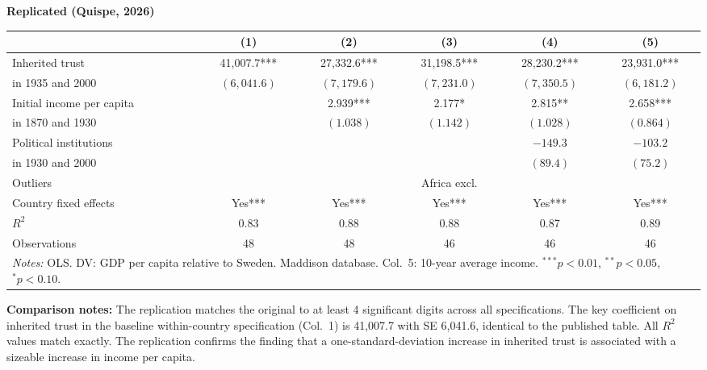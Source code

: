 \documentclass[11pt,a4paper]{article}
\begin{document}
\begin{minipage}[t]{0.48\textwidth}
\centering
\textbf{\large Replicated (Quispe, 2026)}
\vspace{0.3cm}

\begin{adjustbox}{max width=\textwidth}
\begin{tabular}{lccccc}
\toprule
 & (1) & (2) & (3) & (4) & (5) \\
\midrule
Inherited trust & 41,007.7*** & 27,332.6*** & 31,198.5*** & 28,230.2*** & 23,931.0*** \\
in 1935 and 2000 & $(6{,}041.6)$ & $(7{,}179.6)$ & $(7{,}231.0)$ & $(7{,}350.5)$ & $(6{,}181.2)$ \\[0.3em]
Initial income per capita &  & 2.939*** & 2.177* & 2.815** & 2.658*** \\
in 1870 and 1930 &  & $(1.038)$ & $(1.142)$ & $(1.028)$ & $(0.864)$ \\[0.3em]
Political institutions &  &  &  & $-149.3$ & $-103.2$ \\
in 1930 and 2000 &  &  &  & $(89.4)$ & $(75.2)$ \\[0.3em]
Outliers &  &  & Africa excl. &  &  \\
\midrule
Country fixed effects & Yes*** & Yes*** & Yes*** & Yes*** & Yes*** \\
$R^2$ & 0.83 & 0.88 & 0.88 & 0.87 & 0.89 \\
Observations & 48 & 48 & 46 & 46 & 46 \\
\bottomrule
\multicolumn{6}{p{0.95\textwidth}}{\footnotesize\textit{Notes:} OLS. DV: GDP per capita relative to Sweden. Maddison database. Col.\ 5: 10-year average income. $^{***}p<0.01$, $^{**}p<0.05$, $^{*}p<0.10$.}
\end{tabular}
\end{adjustbox}
\end{minipage}

\vspace{1cm}
\textbf{Comparison notes:} The replication matches the original to at least 4 significant digits across all specifications. The key coefficient on inherited trust in the baseline within-country specification (Col.\ 1) is 41,007.7 with SE 6,041.6, identical to the published table. All $R^2$ values match exactly. The replication confirms the finding that a one-standard-deviation increase in inherited trust is associated with a sizeable increase in income per capita.

\newpage

\end{document}
